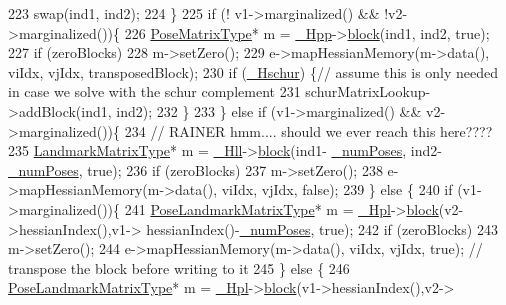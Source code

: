 \begin{DoxyCode}
223           swap(ind1, ind2);
224         \}
225         \textcolor{keywordflow}{if} (! v1->marginalized() && !v2->marginalized())\{
226           \hyperlink{classg2o_1_1BlockSolver_a8c7c43d361bd31e3e0353889ba703bc0}{PoseMatrixType}* m = \hyperlink{classg2o_1_1BlockSolver_ac222d4342825ed8632a87b4f5be94618}{\_Hpp}->\hyperlink{classg2o_1_1SparseBlockMatrix_aaca7b38d2e9a18eebf9e6f5957af0cf7}{block}(ind1, ind2, \textcolor{keyword}{true});
227           \textcolor{keywordflow}{if} (zeroBlocks)
228             m->setZero();
229           e->mapHessianMemory(m->data(), viIdx, vjIdx, transposedBlock);
230           \textcolor{keywordflow}{if} (\hyperlink{classg2o_1_1BlockSolver_a46977934a3e4fb0cd36bc4181ed3ec0e}{\_Hschur}) \{\textcolor{comment}{// assume this is only needed in case we solve with the schur complement}
231             schurMatrixLookup->addBlock(ind1, ind2);
232           \}
233         \} \textcolor{keywordflow}{else} \textcolor{keywordflow}{if} (v1->marginalized() && v2->marginalized())\{
234           \textcolor{comment}{// RAINER hmm.... should we ever reach this here????}
235           \hyperlink{classg2o_1_1BlockSolver_afd898a666343291129d37a979e23ded6}{LandmarkMatrixType}* m = \hyperlink{classg2o_1_1BlockSolver_a88d4c24df24a8fb72be1a4e4cff03d71}{\_Hll}->\hyperlink{classg2o_1_1SparseBlockMatrix_aaca7b38d2e9a18eebf9e6f5957af0cf7}{block}(ind1-
      \hyperlink{classg2o_1_1BlockSolver_a709259fc290d746f4174d25410b7458a}{\_numPoses}, ind2-\hyperlink{classg2o_1_1BlockSolver_a709259fc290d746f4174d25410b7458a}{\_numPoses}, \textcolor{keyword}{true});
236           \textcolor{keywordflow}{if} (zeroBlocks)
237             m->setZero();
238           e->mapHessianMemory(m->data(), viIdx, vjIdx, \textcolor{keyword}{false});
239         \} \textcolor{keywordflow}{else} \{ 
240           \textcolor{keywordflow}{if} (v1->marginalized())\{ 
241             \hyperlink{classg2o_1_1BlockSolver_a96bf60b923f816086cd2f24de38736ec}{PoseLandmarkMatrixType}* m = \hyperlink{classg2o_1_1BlockSolver_a0f6051339990e95aa587145a8a6f4f5f}{\_Hpl}->\hyperlink{classg2o_1_1SparseBlockMatrix_aaca7b38d2e9a18eebf9e6f5957af0cf7}{block}(v2->hessianIndex(),v1->
      hessianIndex()-\hyperlink{classg2o_1_1BlockSolver_a709259fc290d746f4174d25410b7458a}{\_numPoses}, \textcolor{keyword}{true});
242             \textcolor{keywordflow}{if} (zeroBlocks)
243               m->setZero();
244             e->mapHessianMemory(m->data(), viIdx, vjIdx, \textcolor{keyword}{true}); \textcolor{comment}{// transpose the block before writing to it}
245           \} \textcolor{keywordflow}{else} \{
246             \hyperlink{classg2o_1_1BlockSolver_a96bf60b923f816086cd2f24de38736ec}{PoseLandmarkMatrixType}* m = \hyperlink{classg2o_1_1BlockSolver_a0f6051339990e95aa587145a8a6f4f5f}{\_Hpl}->\hyperlink{classg2o_1_1SparseBlockMatrix_aaca7b38d2e9a18eebf9e6f5957af0cf7}{block}(v1->hessianIndex(),v2->

\end{DoxyCode}
